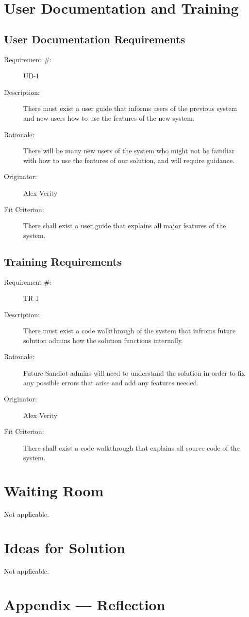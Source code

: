 \documentclass[12pt]{article}
\newenvironment{myreq}[1]{%
\setlist[description]{font=\normalfont\color{darkgray}}%
\begin{tcolorbox}[colframe=black,colback=white, sharp corners, boxrule=1pt]%
\bfseries\color{blue}%
\begin{description}#1}%
{\end{description}\end{tcolorbox}}
\newcommand{\twoinline}[2]{\begin{multicols}{2}#1 #2\end{multicols}}
\newcommand{\reqno}{\item[Requirement \#:]}
\newcommand{\reqdesc}{\item[Description:]}
\newcommand{\reqrat}{\item[Rationale:]}
\newcommand{\reqorig}{\item[Originator:]}
\newcommand{\reqfit}{\item[Fit Criterion:]}
\newcommand{\reqsatis}{\item[Customer Satisfaction:]}
\newcommand{\reqdissat}{\item[Customer Dissatisfaction:]}
\begin{document}
\section{User Documentation and Training}
\subsection{User Documentation Requirements}

\begin{myreq}
  \reqno UD-1
  \reqdesc There must exist a user guide that informs users of the previous
  system and new users how to use the features of the new system.
  \reqrat There will be many new users of the system who might not be familiar
  with how to use the features of our solution, and will require guidance.
  \reqorig Alex Verity
  \reqfit There shall exist a user guide that explains all major features of
  the system.
  \twoinline
    {\reqsatis 3}
    {\reqdissat 1}
\end{myreq}

\subsection{Training Requirements}

\begin{myreq}
  \reqno TR-1
  \reqdesc There must exist a code walkthrough of the system that infroms
  future solution admins how the solution functions internally.
  \reqrat Future Sandlot admins will need to understand the solution in order
  to fix any possible errors that arise and add any features needed.
  \reqorig Alex Verity
  \reqfit There shall exist a code walkthrough that explains all source code
  of the system.
  \twoinline
    {\reqsatis 2}
    {\reqdissat 1}
\end{myreq}

\section{Waiting Room}
Not applicable.

\section{Ideas for Solution}
Not applicable.

\newpage{}
\section*{Appendix --- Reflection}
\end{document}
